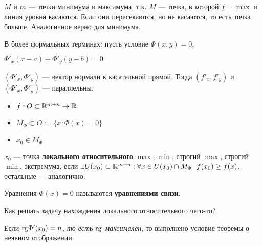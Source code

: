 \begin{example}
\begin{figure}[h]
\centering
    \end{figure}

    $M$ и $m$ --- точки минимума и максимума, т.к. $M$ --- точка, в которой $f=\max$ и линия уровня касаются. Если они пересекаются, но не касаются, то есть точка больше. Аналогичное верно для минимума.

    В более формальных терминах: пусть условие $\Phi(x, y) = 0$.

    $\Phi'_x(x-a) + \Phi'_y(y-b) = 0$

    $(\Phi'_x, \Phi'_y)$ --- вектор нормали к касательной прямой. Тогда $(f'_x, f'_y)$ и $(\Phi'_x, \Phi'_y)$ --- параллельны.
\end{example}

\begin{definition}\itemfix
    \begin{itemize}
        \item $f: O\subset\mathbb{R}^{m+n} \to\mathbb{R}$
        \item $M_\Phi \subset O := \{ x : \Phi(x) = 0 \}$
        \item $x_0\in M_\Phi$
    \end{itemize}
    $x_0$ --- точка \textbf{локального относительного} $\max, \min$, строгий $\max$, строгий $\min$, экстремума, если $\exists U(x_0)\subset\mathbb{R}^{m+n} : \forall x\in U(x_0)\cap M_\Phi \ \ f(x_0) \ge f(x)$, остальные --- аналогично.

    Уравнения $\Phi(x) = 0$ называются \textbf{уравнениями связи}.
\end{definition}

Как решать задачу нахождения локального относительного чего-то?

Если $\text{rg} \Phi'(x_0) = n$, \textit{то есть $\text{rg}$ максимален}, то выполнено условие теоремы о неявном отображении.

